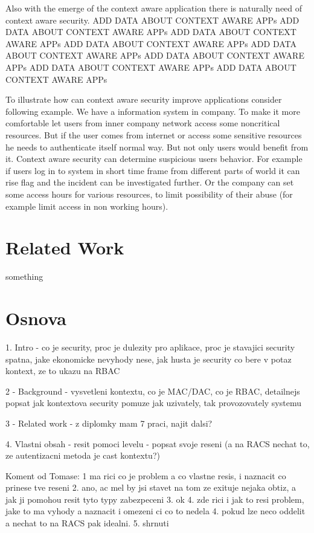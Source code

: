 \documentclass{poster15}
\begin{document}
Also with the emerge of the context aware application there is naturally need of context aware security. ADD DATA ABOUT CONTEXT AWARE APPs ADD DATA ABOUT CONTEXT AWARE APPs ADD DATA ABOUT CONTEXT AWARE APPs ADD DATA ABOUT CONTEXT AWARE APPs ADD DATA ABOUT CONTEXT AWARE APPs ADD DATA ABOUT CONTEXT AWARE APPs ADD DATA ABOUT CONTEXT AWARE APPs ADD DATA ABOUT CONTEXT AWARE APPs

To illustrate how can context aware security improve applications consider following example. We have a information system in company. To make it more comfortable let users from inner company network access some noncritical resources. But if the user comes from internet or access some sensitive resources he needs to authenticate itself normal way. But not only users would benefit from it. Context aware security can determine suspicious users behavior. For example if users log in to system in short time frame from different parts of world it can rise flag and the incident can be investigated further. Or the company can set some access hours for various resources, to limit possibility of their abuse (for example limit access in non working hours).

\section{Related Work}

something

\section{Osnova}
1. Intro - co je security, proc je dulezity pro aplikace, proc je stavajici security spatna, jake ekonomicke nevyhody nese, jak husta je security co bere v potaz kontext, ze to ukazu na RBAC

2 - Background - vysvetleni kontextu, co je MAC/DAC, co je RBAC, detailnejs popsat jak kontextova security pomuze jak uzivately, tak provozovately systemu

3 - Related work - z diplomky mam 7 praci, najit dalsi?

4. Vlastni obsah - resit pomoci levelu - popsat svoje reseni (a na RACS nechat to, ze autentizacni metoda je cast kontextu?)

Koment od Tomase:
1 ma rici co je problem a co vlastne resis, i naznacit co prinese tve reseni
2. ano, ac mel by jsi stavet na tom ze exituje nejaka obtiz, a jak ji pomohou resit tyto typy zabezpeceni
3. ok
4. zde rici i jak to resi problem, jake to ma vyhody a naznacit i omezeni ci co to nedela
4. pokud lze neco oddelit a nechat to na RACS pak idealni.
5. shrnuti
\end{document}
